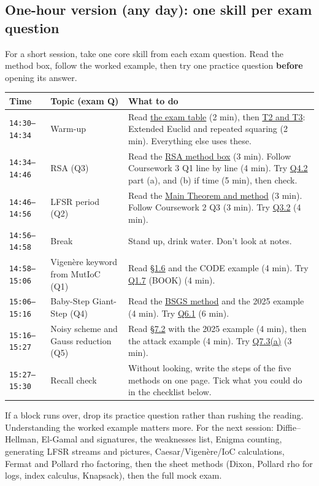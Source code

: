 \documentclass[11pt,a4paper]{article}
\begin{document}
\subsection*{One-hour version (any day): one skill per exam question}
For a short session, take one core skill from each exam question. Read the method box, follow the worked example, then try one practice question \textbf{before} opening its answer.\par
\begin{xltabular}{\linewidth}{|l|>{\raggedright\arraybackslash}X|>{\raggedright\arraybackslash}X|}\hline
{}\textbf{Time} & \textbf{Topic (exam Q)} & \textbf{What to do} \\ \hline\endhead
\texttt{14:30–14:34} & Warm-up & Read \hyperref[start]{the exam table} (2 min), then \hyperref[toolkit]{T2 and T3}: Extended Euclid and repeated squaring (2 min). Everything else uses these. \\ \hline
\texttt{14:34–14:46} & RSA (Q3) & Read the \hyperref[ch4-rsa]{RSA method box} (3 min). Follow Coursework 3 Q1 line by line (4 min). Try \hyperref[ch4-q]{Q4.2} part (a), and (b) if time (5 min), then check. \\ \hline
\texttt{14:46–14:56} & LFSR period (Q2) & Read the \hyperref[ch3-period]{Main Theorem and method} (3 min). Follow Coursework 2 Q3 (3 min). Try \hyperref[ch3-q]{Q3.2} (4 min). \\ \hline
\texttt{14:56–14:58} & Break & Stand up, drink water. Don't look at notes. \\ \hline
\texttt{14:58–15:06} & Vigenère keyword from MutIoC (Q1) & Read \hyperref[ch1-ioc]{§1.6} and the CODE example (4 min). Try \hyperref[ch1-q]{Q1.7} (BOOK) (4 min). \\ \hline
\texttt{15:06–15:16} & Baby-Step Giant-Step (Q4) & Read the \hyperref[ch6]{BSGS method} and the 2025 example (4 min). Try \hyperref[ch56-q]{Q6.1} (6 min). \\ \hline
\texttt{15:16–15:27} & Noisy scheme and Gauss reduction (Q5) & Read \hyperref[ch7]{§7.2} with the 2025 example (4 min), then the attack example (4 min). Try \hyperref[ch7-q]{Q7.3(a)} (3 min). \\ \hline
\texttt{15:27–15:30} & Recall check & Without looking, write the steps of the five methods on one page. Tick what you could do in the checklist below. \\ \hline
\end{xltabular}
{\small\color{black!70} If a block runs over, drop its practice question rather than rushing the reading. Understanding the worked example matters more. For the next session: Diffie–Hellman, El-Gamal and signatures, the weaknesses list, Enigma counting, generating LFSR streams and pictures, Caesar/Vigenère/IoC calculations, Fermat and Pollard rho factoring, then the sheet methods (Dixon, Pollard rho for logs, index calculus, Knapsack), then the full mock exam.}\par
\end{document}

